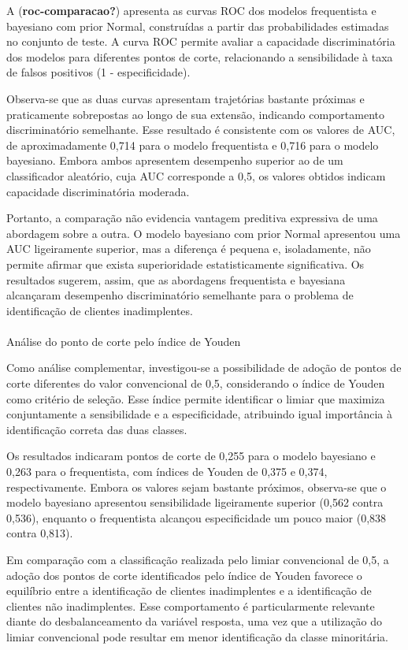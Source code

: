 \documentclass[
  brazilian,
  12pt,
  letterpaper,
  DIV=11,
  numbers=noendperiod]{scrartcl}
\makeatletter
\let\oldparagraph\paragraph
\renewcommand{\paragraph}{
    \@ifstar
      \xxxParagraphStar
      \xxxParagraphNoStar
  }
\newcommand{\xxxParagraphStar}[1]{\oldparagraph*{#1}\mbox{}}
\newcommand{\xxxParagraphNoStar}[1]{\oldparagraph{#1}\mbox{}}
\makeatother
\begin{document}
A (\textbf{roc-comparacao?}) apresenta as curvas ROC dos modelos
frequentista e bayesiano com prior Normal, construídas a partir das
probabilidades estimadas no conjunto de teste. A curva ROC permite
avaliar a capacidade discriminatória dos modelos para diferentes pontos
de corte, relacionando a sensibilidade à taxa de falsos positivos (1 -
especificidade).

Observa-se que as duas curvas apresentam trajetórias bastante próximas e
praticamente sobrepostas ao longo de sua extensão, indicando
comportamento discriminatório semelhante. Esse resultado é consistente
com os valores de AUC, de aproximadamente 0,714 para o modelo
frequentista e 0,716 para o modelo bayesiano. Embora ambos apresentem
desempenho superior ao de um classificador aleatório, cuja AUC
corresponde a 0,5, os valores obtidos indicam capacidade discriminatória
moderada.

Portanto, a comparação não evidencia vantagem preditiva expressiva de
uma abordagem sobre a outra. O modelo bayesiano com prior Normal
apresentou uma AUC ligeiramente superior, mas a diferença é pequena e,
isoladamente, não permite afirmar que exista superioridade
estatisticamente significativa. Os resultados sugerem, assim, que as
abordagens frequentista e bayesiana alcançaram desempenho
discriminatório semelhante para o problema de identificação de clientes
inadimplentes.

\paragraph{Análise do ponto de corte pelo índice de
Youden}\label{anuxe1lise-do-ponto-de-corte-pelo-uxedndice-de-youden}

Como análise complementar, investigou-se a possibilidade de adoção de
pontos de corte diferentes do valor convencional de 0,5, considerando o
índice de Youden como critério de seleção. Esse índice permite
identificar o limiar que maximiza conjuntamente a sensibilidade e a
especificidade, atribuindo igual importância à identificação correta das
duas classes.

Os resultados indicaram pontos de corte de 0,255 para o modelo bayesiano
e 0,263 para o frequentista, com índices de Youden de 0,375 e 0,374,
respectivamente. Embora os valores sejam bastante próximos, observa-se
que o modelo bayesiano apresentou sensibilidade ligeiramente superior
(0,562 contra 0,536), enquanto o frequentista alcançou especificidade um
pouco maior (0,838 contra 0,813).

Em comparação com a classificação realizada pelo limiar convencional de
0,5, a adoção dos pontos de corte identificados pelo índice de Youden
favorece o equilíbrio entre a identificação de clientes inadimplentes e
a identificação de clientes não inadimplentes. Esse comportamento é
particularmente relevante diante do desbalanceamento da variável
resposta, uma vez que a utilização do limiar convencional pode resultar
em menor identificação da classe minoritária.
\end{document}
